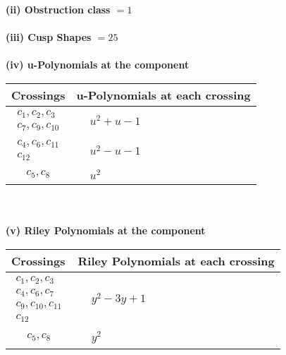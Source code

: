 \documentclass[1p]{elsarticle_modified}
\theoremstyle{definition}
\begin{document}
\flushleft \textbf{(ii) Obstruction class $= 1$}\\~\\
\flushleft \textbf{(iii) Cusp Shapes $= 25$}\\~\\
\newpage\renewcommand{\arraystretch}{1}
\flushleft \textbf{(iv) u-Polynomials at the component}\newline \\
\begin{tabular}{m{50pt}|m{274pt}}
Crossings & \hspace{64pt}u-Polynomials at each crossing \\
\hline $$\begin{aligned}c_{1},c_{2},c_{3}\\c_{7},c_{9},c_{10}\end{aligned}$$&$\begin{aligned}
&u^2+u-1
\end{aligned}$\\
\hline $$\begin{aligned}c_{4},c_{6},c_{11}\\c_{12}\end{aligned}$$&$\begin{aligned}
&u^2- u-1
\end{aligned}$\\
\hline $$\begin{aligned}c_{5},c_{8}\end{aligned}$$&$\begin{aligned}
&u^2
\end{aligned}$\\
\hline
\end{tabular}\\~\\
\newpage\renewcommand{\arraystretch}{1}
\flushleft \textbf{(v) Riley Polynomials at the component}\newline \\
\begin{tabular}{m{50pt}|m{274pt}}
Crossings & \hspace{64pt}Riley Polynomials at each crossing \\
\hline $$\begin{aligned}c_{1},c_{2},c_{3}\\c_{4},c_{6},c_{7}\\c_{9},c_{10},c_{11}\\c_{12}\end{aligned}$$&$\begin{aligned}
&y^2-3 y+1
\end{aligned}$\\
\hline $$\begin{aligned}c_{5},c_{8}\end{aligned}$$&$\begin{aligned}
&y^2
\end{aligned}$\\
\hline
\end{tabular}\\~\\
\end{document}
